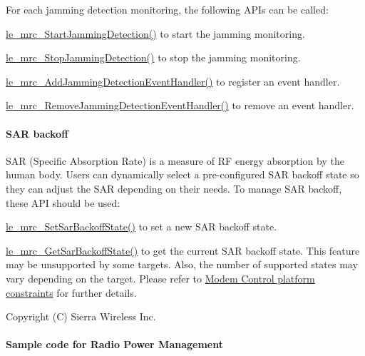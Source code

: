 For each jamming detection monitoring, the following A\+P\+Is can be called\+:
\begin{DoxyItemize}
\item \hyperlink{le__mrc__interface_8h_ab1876d046a3aff763a2159da29f0481c}{le\+\_\+mrc\+\_\+\+Start\+Jamming\+Detection()} to start the jamming monitoring.
\item \hyperlink{le__mrc__interface_8h_a8cd71575d2d253e5b829bd120a70c491}{le\+\_\+mrc\+\_\+\+Stop\+Jamming\+Detection()} to stop the jamming monitoring.
\item \hyperlink{le__mrc__interface_8h_a191db5e4637e5307db7ee10104128867}{le\+\_\+mrc\+\_\+\+Add\+Jamming\+Detection\+Event\+Handler()} to register an event handler.
\item \hyperlink{le__mrc__interface_8h_a68746d5c30c0102321e7e922bd9375cd}{le\+\_\+mrc\+\_\+\+Remove\+Jamming\+Detection\+Event\+Handler()} to remove an event handler.
\end{DoxyItemize}\hypertarget{c_mrc_le_mrc_sar}{}\paragraph{S\+A\+R backoff}\label{c_mrc_le_mrc_sar}
S\+AR (Specific Absorption Rate) is a measure of RF energy absorption by the human body. Users can dynamically select a pre-\/configured S\+AR backoff state so they can adjust the S\+AR depending on their needs. To manage S\+AR backoff, these A\+PI should be used\+:
\begin{DoxyItemize}
\item \hyperlink{le__mrc__interface_8h_adc99580fe5d419451e452cfcc805509d}{le\+\_\+mrc\+\_\+\+Set\+Sar\+Backoff\+State()} to set a new S\+AR backoff state.
\item \hyperlink{le__mrc__interface_8h_a8543cc2e58f0ddfcccca0942afda743a}{le\+\_\+mrc\+\_\+\+Get\+Sar\+Backoff\+State()} to get the current S\+AR backoff state. This feature may be unsupported by some targets. Also, the number of supported states may vary depending on the target. Please refer to \hyperlink{platformConstraintsMdc}{Modem Control platform constraints} for further details.
\end{DoxyItemize}





Copyright (C) Sierra Wireless Inc. \hypertarget{c_mrcRadioPower}{}\paragraph{Sample code for Radio Power Management}\label{c_mrcRadioPower}

